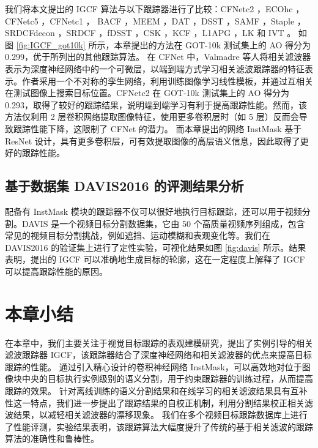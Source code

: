 我们将本文提出的 IGCF 算法与以下跟踪器进行了比较：CFNetc2 \cite{Valmadre2017EndtoEndRL}，ECOhc \cite{danelljan2017eco}，CFNetc5 \cite{Valmadre2017EndtoEndRL}，CFNetc1 \cite{Valmadre2017EndtoEndRL}， BACF \cite{Galoogahi2017LearningBC}，MEEM \cite{Zhang2014MEEMRT}，DAT \cite{Possegger2015InDO}，DSST \cite{Danelljan2014AccurateSE}，SAMF \cite{Li2014ASA}，Staple \cite{Bertinetto2016StapleC}，SRDCFdecon \cite{Danelljan2016AdaptiveDO}，SRDCF \cite{Danelljan2015LearningSR}，fDSST \cite{Danelljan2017DiscriminativeSS}，CSK \cite{Henriques2012ExploitingTC}，KCF \cite{henriques2014high-speed}，L1APG \cite{Bao2012RealTR}，LK \cite{Shi1994GoodFT} 和 IVT \cite{Ross2007IncrementalLF}。
如图 \ref{fig:IGCF_got10k} 所示，本章提出的方法在 GOT-10k 测试集上的 AO 得分为 0.299，优于所列出的其他跟踪算法。
在 CFNet \cite{Valmadre2017EndtoEndRL} 中，Valmadre 等人将相关滤波器表示为深度神经网络中的一个可微层，以端到端方式学习相关滤波跟踪器的特征表示。作者采用一个不对称的孪生网络，利用训练图像学习线性模板，并通过互相关在测试图像上搜索目标位置。CFNetc2 在 GOT-10k 测试集上的 AO 得分为 0.293，取得了较好的跟踪结果，说明端到端学习有利于提高跟踪性能。然而，该方法仅利用 2 层卷积网络提取图像特征，使用更多卷积层时（如 5 层）反而会导致跟踪性能下降，这限制了 CFNet 的潜力。
而本章提出的网络 InstMask 基于 ResNet 设计，具有更多卷积层，可有效提取图像的高层语义信息，因此取得了更好的跟踪性能。

\subsection{基于数据集 DAVIS2016 的评测结果分析}
配备有 InstMask 模块的跟踪器不仅可以很好地执行目标跟踪，还可以用于视频分割。DAVIS \cite{Perazzi2016} 是一个视频目标分割数据集，它由 50 个高质量视频序列组成，包含常见的视频目标分割挑战，例如遮挡、运动模糊和表观变化等。我们在 DAVIS2016 的验证集上进行了定性实验，可视化结果如图 \ref{fig:davis} 所示。结果表明，提出的 IGCF 可以准确地生成目标的轮廓，这在一定程度上解释了 IGCF 可以提高跟踪性能的原因。

\section{本章小结}
在本章中，我们主要关注于视觉目标跟踪的表观建模研究，提出了实例引导的相关滤波跟踪器 IGCF，该跟踪器结合了深度神经网络和相关滤波器的优点来提高目标跟踪的性能。
通过引入精心设计的卷积神经网络 InstMask，可以高效地对位于图像块中央的目标执行实例级别的语义分割，用于约束跟踪器的训练过程，从而提高跟踪的效果。
针对离线训练的语义分割结果和在线学习的相关滤波结果具有互补性这一特点，我们进一步提出了跟踪结果的自校正机制，利用分割结果校正相关滤波结果，以减轻相关滤波器的漂移现象。
我们在多个视频目标跟踪数据库上进行了性能评测，实验结果表明，该跟踪算法大幅度提升了传统的基于相关滤波的跟踪算法的准确性和鲁棒性。